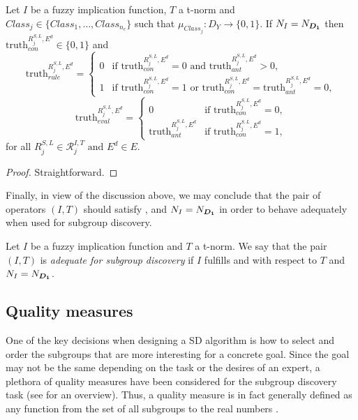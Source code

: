 \begin{proposition}
	Let $I$ be a fuzzy implication function, $T$ a t-norm and \linebreak $Class_j \in \{Class_1,\dots,Class_{n_c}\}$ such that $\mu_{Class_j} : D_Y \to \{0,1\}$. If $N_I=N_{\bm{D_1}}$ then $\text{truth}_{con}^{R^{S,L}_j,E^d} \in \{0,1\}$ and 
	$$ \text{truth}_{rule}^{R^{S,L}_j,E^d} =  			\left\{ \begin{array}{ll}
		0 &   \text{if }   \text{truth}_{con}^{R^{S,L}_j,E^d}=0 \text{ and } \text{truth}_{ant}^{R^{S,L}_j,E^d}>0, \\[1em]
		1 & \text{if } \text{truth}_{con}^{R^{S,L}_j,E^d}=1 \text{ or } \text{truth}_{con}^{R^{S,L}_j,E^d}=\text{truth}_{ant}^{R^{S,L}_j,E^d}=0, 
	\end{array} \right.
	$$
	$$
	\text{truth}_{eval}^{R^{S,L}_j,E^d} = \left\{ \begin{array}{ll}
		0 &   \text{if }   \text{truth}_{con}^{R^{S,L}_j,E^d}=0 , \\[1em]
		\text{truth}_{ant}^{R^{S,L}_j,E^d} & \text{if } \text{truth}_{con}^{R^{S,L}_j,E^d}=1,
	\end{array} \right.$$
for all $R^{S,L}_j \in \mathcal{R}^{I,T}_j \text{ and } E^d \in E$.
\end{proposition}

\begin{proof}
	Straightforward.
\end{proof}

Finally, in view of the discussion above, we may conclude that the pair of operators $(I,T)$ should satisfy \TC, \MTC and $N_I=N_{\bm{D_1}}$ in order to behave adequately when used for subgroup discovery.

\begin{definition}\label{def:adequate_pair}
	Let $I$ be a fuzzy implication function and $T$ a t-norm. We say that the pair $(I,T)$ is \emph{adequate for subgroup discovery} if $I$ fulfills \TC and \MTC with respect to $T$ and $N_I=N_{\bm{D_1}}$. 
\end{definition}

\subsection{Quality measures}\label{subsection:quality_measures}
One of the key decisions when designing a SD algorithm is how to select and order the subgroups that are more interesting for a concrete goal. Since the goal may not be the same depending on the task or the desires of an expert, a plethora of quality measures have been considered for the subgroup discovery task (see \cite{Herrera2011,Rizkallah2019,Helal2016} for an overview). Thus, a quality measure is in fact generally defined as any function from the set of all subgroups to the real numbers \cite{Atzmueller2015}.


